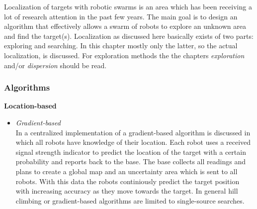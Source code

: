 
Localization of targets with robotic swarms is an area which has been receiving a lot of research attention in the past few years. 
The main goal is to design an algorithm that effectively allows a swarm of robots to explore an unknown area and find the target(s).
Localization as discussed here basically exists of two parts: exploring and searching.
In this chapter mostly only the latter, so the actual localization, is discussed.
For exploration methods the the chapters \emph{exploration} and/or \emph{dispersion} should be read.

\subsubsection{Algorithms}

	\textbf{Location-based}
	\begin{itemize}
		\item
		\textit{Gradient-based}\\
		In \cite{zhang2009gradient} a centralized implementation of a gradient-based algorithm is discussed in which all robots have knowledge of their location.
		Each robot uses a received signal strength indicator to predict the location of the target with a certain probability and reports back to the base.
		The base collects all readings and plans to create a global map and an uncertainty area which is sent to all robots.
		With this data the robots continiously predict the target position with increasing accuracy as they move towards the target.
		In general hill climbing or gradient-based algorithms are limited to single-source searches.
	\end{itemize}

